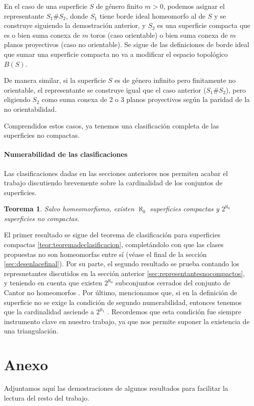\documentclass[a4paper,11pt,spanish, twoside, leqno]{tfg-uam}
\newtheorem{teor}{Teorema}[chapter]
\theoremstyle{definition}
\begin{document}
En el caso de una superficie $S$ de género finito $m>0$, podemos asignar el representante $S_1\# S_2$, donde $S_1$ tiene borde ideal homeomorfo al de $S$ y se construye siguiendo la demostración anterior, y $S_2$ es una superficie compacta que es o bien suma conexa de $m$ toros (caso orientable) o bien suma conexa de $m$ planos proyectivos (caso no orientable). Se sigue de las definiciones de borde ideal que sumar una superficie compacta no va a modificar el espacio topológico $B(S)$.

De manera similar, si la superficie $S$ es de género infinito pero finitamente no orientable, el representante se construye igual que el caso anterior ($S_1\# S_2$), pero eligiendo $S_2$ como suma conexa de 2 o 3 planos proyectivos según la paridad de la no orientabilidad.

Comprendidos estos casos, ya tenemos una clasificación completa de las superficies no compactas.

\subsubsection*{Numerabilidad de las clasificaciones}
Las clasificaciones dadas en las secciones anteriores nos permiten acabar el trabajo discutiendo brevemente sobre la cardinalidad de los conjuntos de superficies. 

\begin{teor}
Salvo homeomorfismo, existen $\aleph_0$ superficies compactas y $2^{\aleph_0}$ superficies no compactas.
\end{teor}
El primer resultado se sigue del teorema de clasificación para superficies compactas \ref{teor:teoremadeclasificacion}, completándolo con que las clases propuestas no son homeomorfas entre sí (véase el final de la sección \ref{sec:desenlacefinal}). Por su parte, el segundo resultado se prueba contando los represnetantes discutidos en la sección anterior \ref{sec:representantesnocompactos}, y teniendo en cuenta que existen $2^{\aleph_0}$ subconjuntos cerrados del conjunto de Cantor no homeomorfos \cite{cerradoscantor}. Por último, mencionamos que, si  en la definición de superficie no se exige la condición de segundo numerabilidad, entonces tenemos que la cardinalidad asciende a $2^{\aleph_1}$ \cite{nosegundonomuerable}. Recordemos que esta condición fue siempre instrumento clave en nuestro trabajo, ya que nos permite suponer la existencia de una triangulación.




\chapter{Anexo}
Adjuntamos aquí las demostraciones de algunos resultados para facilitar la lectura del resto del trabajo.
\end{document}
